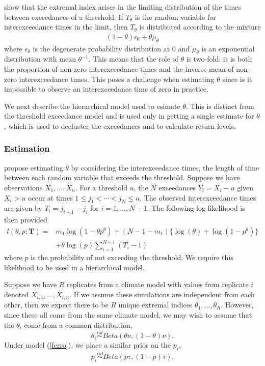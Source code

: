 \documentclass[12pt]{article}
\newcommand{\m}[1]{\mathbf{\bm{#1}}}
\begin{document}
\cite{ferro2003inference} show that the extremal index arises in the limiting distribution of the times between exceedances of a threshold. If $T_\theta$ is the random variable for interexceedance times in the limit, then $T_\theta$ is distributed according to the mixture
\begin{align}
(1-\theta)\epsilon_0 + \theta \mu_\theta
\end{align}
where $\epsilon_0$ is the degenerate probability distribution at $0$ and $\mu_\theta$ is an exponential distribution with mean $\theta^{-1}$. This means that the role of $\theta$ is two-fold: it is both the proportion of non-zero interexceedance times and the inverse mean of non-zero interexceedance times. This poses a challenge when estimating $\theta$ since is it impossible to observe an interexceedance time of zero in practice.

We next describe the hierarchical model used to esimate $\theta$. This is distinct from the threshold exceedance model and is used only in getting a single estimate for $\theta$, which is used to decluster the exceedances and to calculate return levels.

\subsubsection{Estimation}

\cite{ferro2003inference} propose estimating $\theta$ by considering the interexceedance times, the length of time between each random variable that exceeds the threshold. Suppose we have observations $X_1,\ldots,X_n$. For a threshold $u$, the $N$ exceedances $Y_i=X_i-u$ given $X_i>u$ occur at times $1\leq j_1<\cdots< j_N\leq n$. The observed interexceedance times are given by $T_i=j_{i+1}-j_i$ for $i=1,\ldots,N-1$. The following log-likelihood is then provided
\begin{align}
l(\theta, p; \m{T}) =& m_1\log(1-\theta p^\theta) + (N-1-m_1)\{\log(\theta)+ \log(1-p^\theta)\} \nonumber \\
 &+ \theta\log(p)\sum_{i=1}^{N-1}(T_i-1) \label{ferro}
\end{align}
where $p$ is the probability of not exceeding the threshold. We require this likelihood to be used in a hierarchical model.

Suppose we have $R$ replicates from a climate model with values from replicate $i$ denoted $X_{i,1},\ldots,X_{i,n}$. If we assume these simulations are independent from each other, then we expect there to be $R$ unique extremal indices $\theta_1,\ldots,\theta_R$. However, since these all come from the same climate model, we may wish to assume that the $\theta_i$ come from a common distribution,
\[ \theta_i \overset{iid}\sim Beta\left(\theta\nu, (1-\theta)\nu\right). \]
Under model (\ref{ferro}), we place a similar prior on the $p_i$,
\[ p_i \overset{iid}\sim Beta\left(p\tau, (1-p)\tau\right). \]
\end{document}
